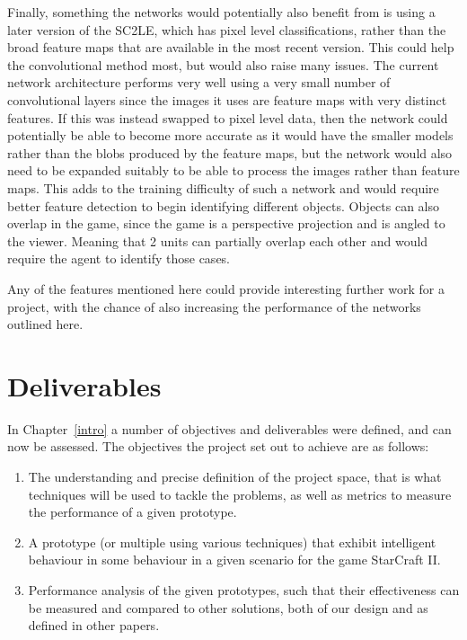 Finally, something the networks would potentially also benefit from is using a
later version of the SC2LE, which has pixel level classifications, rather than
the broad feature maps that are available in the most recent version. This could
help the convolutional method most, but would also raise many issues. The
current network architecture performs very well using a very small number of
convolutional layers since the images it uses are feature maps with very
distinct features. If this was instead swapped to pixel level data, then the
network could potentially be able to become more accurate as it would have the
smaller models rather than the blobs produced by the feature maps, but the
network would also need to be expanded suitably to be able to process the
images rather than feature maps. This adds to the training difficulty of such a network and would require better feature detection to begin identifying different objects. Objects can also overlap in the game, since the game is a perspective projection and is angled to the viewer. Meaning that 2 units can partially overlap each other and would require the agent to identify those cases.

Any of the features mentioned here could provide interesting further work for
a project, with the chance of also increasing the performance of the networks
outlined here.

\section{Deliverables}

In Chapter~\ref{intro} a number of objectives and deliverables were defined, and
can now be assessed. The objectives the project set out to achieve are as
follows:

\begin{enumerate}
    \item The understanding and precise definition of the project space, that is
        what techniques will be used to tackle the problems, as well as metrics
        to measure the performance of a given prototype.
    \item A prototype (or multiple using various techniques) that exhibit
        intelligent behaviour in some behaviour in a given scenario for
        the game StarCraft II\@.
    \item Performance analysis of the given prototypes, such that their
        effectiveness can be measured and compared to other solutions, both of
        our design and as defined in other papers.
\end{enumerate}


